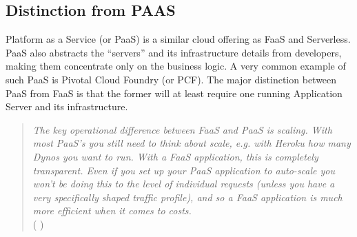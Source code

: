 \subsection{Distinction from PAAS}
Platform as a Service (or PaaS) is a similar cloud offering as FaaS and Serverless. PaaS also abstracts the “servers” and its infrastructure details from developers, making them concentrate only on the business logic. A very common example of such PaaS is Pivotal Cloud Foundry (or PCF). 
The major distinction between PaaS from FaaS is that the former will at least require one running Application Server and its infrastructure. 

\begin{quote}
\textit{
    The key operational difference between FaaS and PaaS is scaling. With most PaaS’s you still need to think about scale, e.g. with Heroku how many Dynos you want to run. With a FaaS application, this is completely transparent. Even if you set up your PaaS application to auto-scale you won’t be doing this to the level of individual requests (unless you have a very specifically shaped traffic profile), and so a FaaS application is much more efficient when it comes to costs.} \\ 
    ( \cite{Roberts_Mike_2018} )
\end{quote}
